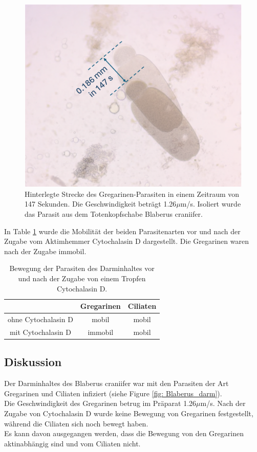 \documentclass[oneside,10pt,a4paper]{report}
\begin{document}
				\begin{figure}[H]
					\centering
					\includegraphics[scale=0.7]{apicomplexa_geschwindigkeit.png}
					\caption{Hinterlegte Strecke des Gregarinen-Parasiten in einem Zeitraum von 147 Sekunden. Die Geschwindigkeit beträgt 1.26$\mu$m/s. Isoliert wurde das Parasit aus dem Totenkopfschabe Blaberus craniifer.}
					\label{fig: natives Apicomplexabewegung}
				\end{figure}
				
				In Table \ref{tab: aktinhem} wurde die Mobilität der beiden Parasitenarten vor und nach der Zugabe vom Aktimhemmer Cytochalasin D dargestellt. Die Gregarinen waren nach der Zugabe immobil.
				\begin{table}[H]
					\centering
					\caption{Bewegung der Parasiten des Darminhaltes vor und nach der Zugabe von einem Tropfen Cytochalasin D.}
					\label{tab: aktinhem}
					\begin{tabular}{ccc}
						\toprule
						&Gregarinen & Ciliaten\\
						\midrule
						ohne Cytochalasin D & mobil & mobil \\
						mit Cytochalasin D & immobil & mobil\\
						\bottomrule			
					\end{tabular}
				\end{table}
				
			\subsection{Diskussion}
			Der Darminhaltes des Blaberus craniifer war mit den Parasiten der Art Gregarinen und Ciliaten infiziert (siehe Figure \ref{fig: Blaberus_darm}).\\
			Die Geschwindigkeit des Gregarinen betrug im Präparat 1.26$\mu$m/s. Nach der Zugabe von Cytochalasin D wurde keine Bewegung von Gregarinen festgestellt, während die Ciliaten sich noch bewegt haben.\\
			Es kann davon ausgegangen werden, dass die Bewegung von den Gregarinen aktinabhängig sind und vom Ciliaten nicht.
	
\end{document}
